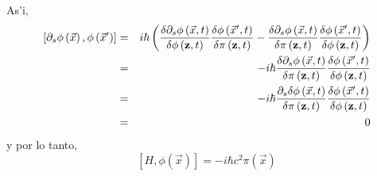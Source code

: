 \begin{enumerate}
As'i,
\begin{eqnarray*}
\left[ \partial _{s}\phi \left( \vec{x}\right) ,\phi \left( \vec{x}%
^{\prime }\right) \right] &=&i\hbar \left( \frac{\delta \partial _{s}\phi
\left( \vec{x},t\right) }{\delta \phi \left( {\bf z},t\right) }\frac{%
\delta \phi \left( \vec{x}^{\prime },t\right) }{\delta \pi \left( {\bf %
z},t\right) }-\frac{\delta \partial _{s}\phi \left( \vec{x},t\right) }{%
\delta \pi \left( {\bf z},t\right) }\frac{\delta \phi \left( \vec{x}%
^{\prime },t\right) }{\delta \phi \left( {\bf z},t\right) }\right) \\
&=&-i\hbar \frac{\delta \partial _{s}\phi \left( \vec{x},t\right) }{%
\delta \pi \left( {\bf z},t\right) }\frac{\delta \phi \left( \vec{x}%
^{\prime },t\right) }{\delta \phi \left( {\bf z},t\right) } \\
&=&-i\hbar \frac{\partial _{s}\delta \phi \left( \vec{x},t\right) }{%
\delta \pi \left( {\bf z},t\right) }\frac{\delta \phi \left( \vec{x}%
^{\prime },t\right) }{\delta \phi \left( {\bf z},t\right) } \\
&=&0
\end{eqnarray*}
y por lo tanto,
\begin{equation}
\left[ H,\phi \left( \vec{x}\right) \right] =-i\hbar c^{2}\pi \left( 
\vec{x}\right) 
\end{equation}


\end{enumerate}
